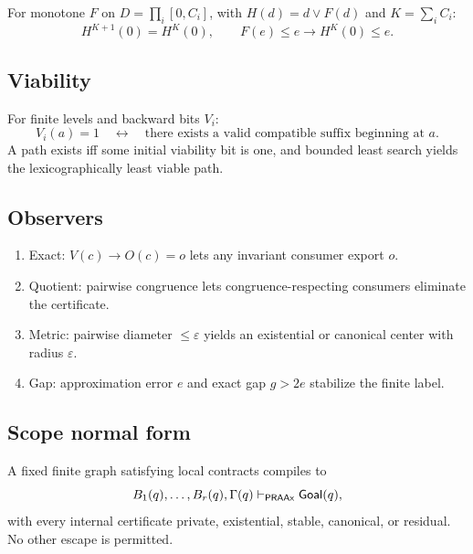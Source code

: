 For monotone \(F\) on \(D=\prod_i[0,C_i]\), with \(H(d)=d\vee F(d)\) and \(K=\sum_iC_i\):
\[
H^{K+1}(0)=H^K(0),
\qquad
F(e)\le e\to H^K(0)\le e.
\]

\subsection{Viability}

For finite levels and backward bits \(V_i\):
\[
V_i(a)=1
\quad\leftrightarrow\quad
\text{there exists a valid compatible suffix beginning at }a.
\]
A path exists iff some initial viability bit is one, and bounded least search yields the lexicographically least viable path.

\subsection{Observers}

\begin{enumerate}
\item Exact: \(V(c)\to O(c)=o\) lets any invariant consumer export \(o\).
\item Quotient: pairwise congruence lets congruence-respecting consumers eliminate the certificate.
\item Metric: pairwise diameter \(\le\varepsilon\) yields an existential or canonical center with radius \(\varepsilon\).
\item Gap: approximation error \(e\) and exact gap \(g>2e\) stabilize the finite label.
\end{enumerate}

\subsection{Scope normal form}

A fixed finite graph satisfying local contracts compiles to
\[
  B_1(q),\ldots,B_r(q),\Gamma(q)\vdash_{\mathsf{PRAAx}}\mathsf{Goal}(q),
\]
with every internal certificate private, existential, stable, canonical, or residual.  No other escape is permitted.
